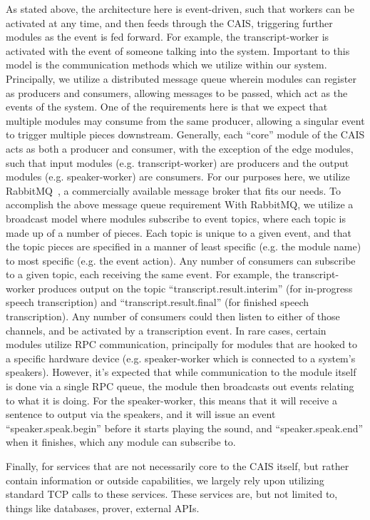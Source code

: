 As stated above, the architecture here is event-driven, such that workers can
be activated at any time, and then feeds through the CAIS, triggering further
modules as the event is fed forward. For example, the transcript-worker is
activated with the event of someone talking into the system. Important to
this model is the communication methods which we utilize within our system.
Principally, we utilize a distributed message queue wherein modules can
register as producers and consumers, allowing messages to be passed, which
act as the events of the system. One of the requirements here is that we
expect that multiple modules may consume from the same producer, allowing
a singular event to trigger multiple pieces downstream. Generally, each
``core'' module of the CAIS acts as both a producer and consumer, with
the exception of the edge modules, such that input modules (e.g. 
transcript-worker) are producers and the output modules (e.g. speaker-worker)
are consumers. For our purposes here, we utilize 
RabbitMQ~\cite{pivotal_software_rabbitmq_2020}, a commercially available
message broker that fits our needs. To accomplish the above message queue
requirement With RabbitMQ, we utilize a broadcast model where modules
subscribe to event topics, where each topic is made up of a number of pieces. 
Each topic is
unique to a given event, and that the topic pieces are specified in a manner of
least specific (e.g. the module name) to most specific (e.g. the event action).
Any number of consumers can subscribe to a given topic, each receiving the same
event. For example, the transcript-worker produces output on the topic
``transcript.result.interim'' (for in-progress speech transcription) and
``transcript.result.final'' (for finished speech transcription). Any number of
consumers could then listen to either of those channels, and be activated by
a transcription event. In rare cases, certain modules utilize RPC communication,
principally for modules that are hooked to a specific hardware device (e.g.
speaker-worker which is connected to a system's speakers). However, it's
expected that while communication to the module itself is done via a single RPC
queue, the module then broadcasts out events relating to what it is doing. For
the speaker-worker, this means that it will receive a sentence to output
via the speakers, and it will issue an event ``speaker.speak.begin'' before
it starts playing the sound, and ``speaker.speak.end'' when it finishes, which
any module can subscribe to.

Finally, for services that are not necessarily core to the CAIS itself, but
rather contain information or outside capabilities, we largely rely upon
utilizing standard TCP calls to these services. These services are, but not
limited to, things like databases, prover, external APIs.

